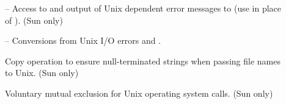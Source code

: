 \begin{description}
\item[] --
    Access to  and output of Unix dependent error messages
    to  (use in place of ).  (Sun only)

\item[] --
    Conversions from Unix I/O errors and .

\item[]
    Copy operation to ensure null-terminated strings when passing file
    names to Unix. (Sun only)

\item[]
    Voluntary mutual exclusion for Unix operating system calls.
    (Sun only)

\end{description}

